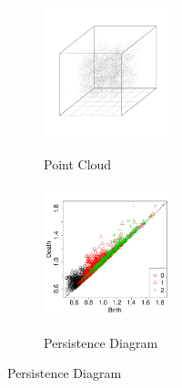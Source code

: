 \documentclass[12pt]{article}
\begin{document}
\begin{figure}[htbp]
   \centering
  \begin{subfigure}{.48\textwidth}
    \centering
        \caption{Point Cloud}
        \includegraphics[height = 1.5in]{figure_5_plot.pdf}
    \label{fig:examplestest1}
  \end{subfigure}
    \begin{subfigure}{.48\textwidth}
    \centering
        \caption{Persistence Diagram}
        \includegraphics[height = 1.5in]{figure_5_pd.pdf}
    \label{fig:examplestest2}
  \end{subfigure}


\end{figure}
\end{document}
